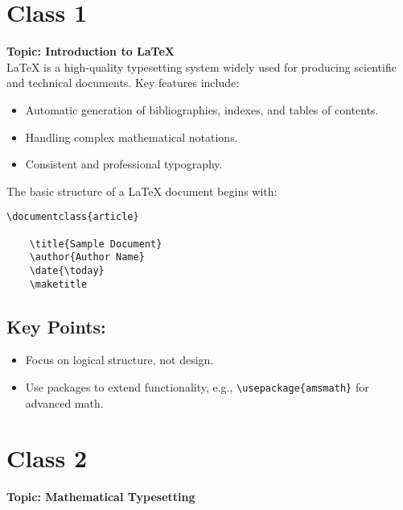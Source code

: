 

\begin{abstract}
    This document serves as a class notebook, providing a datewise breakdown of concepts covered in \LaTeX{}. Each section represents a specific class or date, detailing topics such as document structure, formatting, mathematical typesetting, and more.
\end{abstract}

\section*{Class 1}
\textbf{Topic: Introduction to \LaTeX} \\

\LaTeX{} is a high-quality typesetting system widely used for producing scientific and technical documents. Key features include:
\begin{itemize}
    \item Automatic generation of bibliographies, indexes, and tables of contents.
    \item Handling complex mathematical notations.
    \item Consistent and professional typography.
\end{itemize}

The basic structure of a \LaTeX{} document begins with:
\begin{verbatim}
\documentclass{article}

    \title{Sample Document}
    \author{Author Name}
    \date{\today}
    \maketitle

\end{verbatim}

\subsection*{Key Points:}
\begin{itemize}
    \item Focus on logical structure, not design.
    \item Use packages to extend functionality, e.g., \verb|\usepackage{amsmath}| for advanced math.
\end{itemize}

\section*{Class 2}
\textbf{Topic: Mathematical Typesetting} \\

